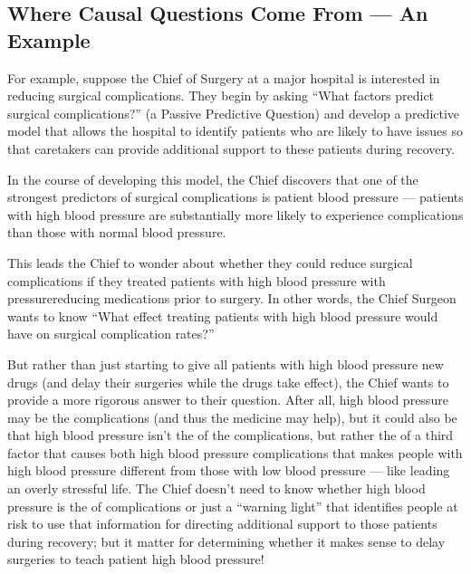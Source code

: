 \documentclass[letterpaper,10pt,english]{jupyterBook}
\begin{document}
\subsection{Where Causal Questions Come From — An Example}
\label{\detokenize{30_questions/30_using_causal_questions:where-causal-questions-come-from-an-example}}
\sphinxAtStartPar
For example, suppose the Chief of Surgery at a major hospital is interested in reducing surgical complications. They begin by asking “What factors predict surgical complications?” (a Passive Predictive Question) and develop a predictive model that allows the hospital to identify patients who are likely to have issues so that caretakers can provide additional support to these patients during recovery.

\sphinxAtStartPar
In the course of developing this model, the Chief discovers that one of the strongest predictors of surgical complications is patient blood pressure — patients with high blood pressure are substantially more likely to experience complications than those with normal blood pressure.

\sphinxAtStartPar
This leads the Chief to wonder about whether they could reduce surgical complications if they treated patients with high blood pressure with pressure\sphinxhyphen{}reducing medications prior to surgery. In other words, the Chief Surgeon wants to know “What effect treating patients with high blood pressure would have on surgical complication rates?”

\sphinxAtStartPar
But rather than just starting to give all patients with high blood pressure new drugs (and delay their surgeries while the drugs take effect), the Chief wants  to provide a more rigorous answer to their question. After all, high blood pressure may be  the complications (and thus the medicine may help), but it could also be that high blood pressure isn’t the  of the complications, but rather the  of a third factor that causes both high blood pressure  complications that makes people with high blood pressure different from those with low blood pressure — like leading an overly stressful life. The Chief doesn’t need to know whether high blood pressure is the  of complications or just a “warning light” that identifies people at risk to use that information for directing additional support to those patients during recovery; but it  matter for determining whether it makes sense to delay surgeries to teach patient high blood pressure!
\end{document}
